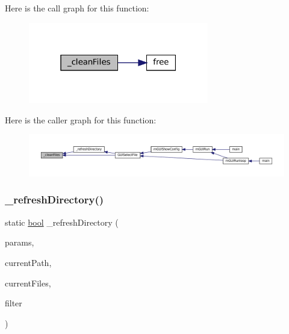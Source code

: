 Here is the call graph for this function\+:
\nopagebreak
\begin{figure}[H]
\begin{center}
\leavevmode
\includegraphics[width=223pt]{file-select_8c_a9270d5f5d4df7b53e1c337065ddf44bf_cgraph}
\end{center}
\end{figure}
Here is the caller graph for this function\+:
\nopagebreak
\begin{figure}[H]
\begin{center}
\leavevmode
\includegraphics[width=350pt]{file-select_8c_a9270d5f5d4df7b53e1c337065ddf44bf_icgraph}
\end{center}
\end{figure}
\mbox{\label{file-select_8c_ad8e0bb9d5b8355bc27bdc9a55dcc2e75}} 
\subsubsection{\texorpdfstring{\+\_\+refresh\+Directory()}{\_refreshDirectory()}}
{\footnotesize\ttfamily static \mbox{\hyperlink{libretro_8h_a4a26dcae73fb7e1528214a068aca317e}{bool}} \+\_\+refresh\+Directory (\begin{DoxyParamCaption}\item[{struct G\+U\+I\+Params $\ast$}]{params,  }\item[{const char $\ast$}]{current\+Path,  }\item[{struct G\+U\+I\+Menu\+Item\+List $\ast$}]{current\+Files,  }\item[{\mbox{\hyperlink{libretro_8h_a4a26dcae73fb7e1528214a068aca317e}{bool}}($\ast$)(struct V\+File $\ast$)}]{filter }\end{DoxyParamCaption})\hspace{0.3cm}{\ttfamily [static]}}

